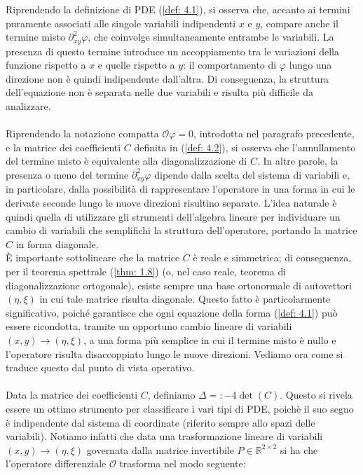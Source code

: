 \documentclass[a4paper,12pt]{report}
\begin{document}
Riprendendo la definizione di PDE (\ref{def: 4.1}), si osserva che, accanto ai termini puramente associati alle singole variabili indipendenti $x$ e $y$, compare anche il termine misto $\partial_{xy}^2\varphi$, che coinvolge simultaneamente entrambe le variabili. La presenza di questo termine introduce un accoppiamento tra le variazioni della funzione rispetto a $x$ e quelle rispetto a $y$: il comportamento di $\varphi$ lungo una direzione non è quindi indipendente dall’altra. Di conseguenza, la struttura dell’equazione non è separata nelle due variabili e risulta più difficile da analizzare.
\\
\\Riprendendo la notazione compatta $\mathcal{O}\varphi=0$, introdotta nel paragrafo precedente, e la matrice dei coefficienti $C$ definita in (\ref{def: 4.2}), si osserva che l’annullamento del termine misto è equivalente alla diagonalizzazione di $C$. In altre parole, la presenza o meno del termine $\partial_{xy}^2\varphi$ dipende dalla scelta del sistema di variabili e, in particolare, dalla possibilità di rappresentare l’operatore in una forma in cui le derivate seconde lungo le nuove direzioni risultino separate. L’idea naturale è quindi quella di utilizzare gli strumenti dell’algebra lineare per individuare un cambio di variabili che semplifichi la struttura dell’operatore, portando la matrice $C$ in forma diagonale.
\\È importante sottolineare che la matrice $C$ è reale e simmetrica; di conseguenza, per il teorema spettrale (\ref{thm: 1.8}) (o, nel caso reale, teorema di diagonalizzazione ortogonale), esiste sempre una base ortonormale di autovettori $(\eta,\xi)$ in cui tale matrice risulta diagonale. Questo fatto è particolarmente significativo, poiché garantisce che ogni equazione della forma (\ref{def: 4.1}) può essere ricondotta, tramite un opportuno cambio lineare di variabili $(x,y)\to(\eta,\xi)$, a una forma più semplice in cui il termine misto è nullo e l’operatore risulta disaccoppiato lungo le nuove direzioni. Vediamo ora come si traduce questo dal punto di vista operativo. 
\\
\\Data la matrice dei coefficienti $C$, definiamo $\Delta=:-4\det(C)$. Questo si rivela essere un ottimo strumento per classificare i vari tipi di PDE, poichè il suo segno è indipendente dal sistema di coordinate (riferito sempre allo spazi delle variabili). Notiamo infatti che data una trasformazione lineare di variabili $(x,y)\to(\eta,\xi)$ governata dalla matrice invertibile $P\in \mathbb{R}^{2\times 2}$ si ha che l'operatore differenziale $\mathcal{O}$ trasforma nel modo seguente:
\end{document}
